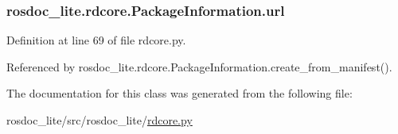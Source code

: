 \subsubsection[{\texorpdfstring{url}{url}}]{\setlength{\rightskip}{0pt plus 5cm}rosdoc\+\_\+lite.\+rdcore.\+Package\+Information.\+url}\hypertarget{classrosdoc__lite_1_1rdcore_1_1PackageInformation_a0ef2dba844b386398740004bc74d1bce}{}\label{classrosdoc__lite_1_1rdcore_1_1PackageInformation_a0ef2dba844b386398740004bc74d1bce}


Definition at line 69 of file rdcore.\+py.



Referenced by rosdoc\+\_\+lite.\+rdcore.\+Package\+Information.\+create\+\_\+from\+\_\+manifest().



The documentation for this class was generated from the following file\+:\begin{DoxyCompactItemize}
\item 
rosdoc\+\_\+lite/src/rosdoc\+\_\+lite/\hyperlink{rdcore_8py}{rdcore.\+py}\end{DoxyCompactItemize}
